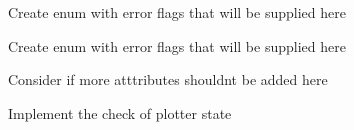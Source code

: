 
\begin{DoxyRefList}
\item[Global \mbox{\hyperlink{joypad_8c_af9aace1b44b73111e15aa39f06f43456}{\+\_\+\+\_\+attribute\+\_\+\+\_\+}} ((weak))]\label{todo__todo000002}%
%
Create enum with error flags that will be supplied here

\label{todo__todo000004}%
%
Create enum with error flags that will be supplied here 
\item[Global \mbox{\hyperlink{joypad_8c_ac8bd8070175f43b5dd037418cfc86a96}{joy\+Ioctl}} (JOY\+\_\+\+Handle\+Type\+Def joy\+\_\+id, JOY\+\_\+\+Read\+Func\+Type\+Def $\ast$read\+\_\+f)]\label{todo__todo000003}%
%
Consider if more atttributes shouldn\textquotesingle{}t be added here  
\item[Global \mbox{\hyperlink{execution_8c_a0721f71e634904a881893a261d3918d8}{plotter\+Moving}} (Comm\+Data $\ast$comm\+\_\+h)]\label{todo__todo000001}%
%
Implement the check of plotter state
\end{DoxyRefList}